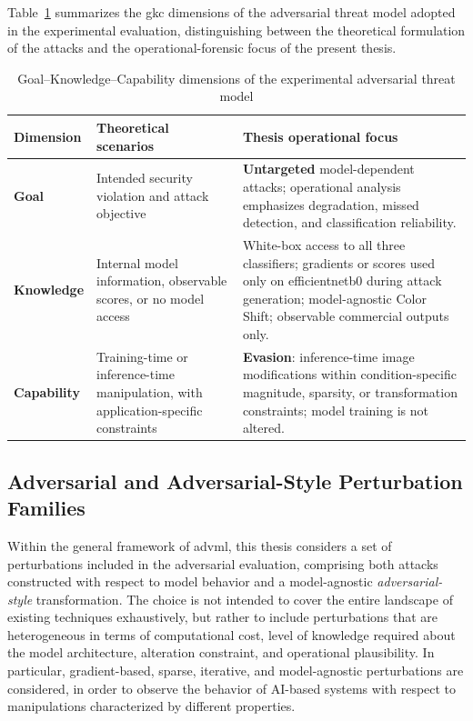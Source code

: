 Table~\ref{tab:threat_model} summarizes the \gls{gkc} dimensions of the adversarial
threat model adopted in the experimental evaluation, distinguishing between the
theoretical formulation of the attacks and the operational-forensic focus of
the present thesis.

\begin{table}[htbp]
    \centering
    \small
    \renewcommand{\arraystretch}{1.25}
    \begin{tabular}{@{}>{\raggedright\arraybackslash}p{}>{\raggedright\arraybackslash}p{}>{\raggedright\arraybackslash}p{}@{}}
        \toprule
        \textbf{Dimension} & \textbf{Theoretical scenarios} & \textbf{Thesis operational focus} \\
        \midrule
        \textbf{Goal} &
        Intended security violation and attack objective &
        \textbf{Untargeted} model-dependent attacks; operational analysis emphasizes degradation, missed detection, and classification reliability. \\
        \textbf{Knowledge} &
        Internal model information, observable scores, or no model access &
        White-box access to all three classifiers; gradients or scores used only on \gls{efficientnetb0} during attack generation; model-agnostic Color Shift; observable commercial outputs only. \\
        \textbf{Capability} &
        Training-time or inference-time manipulation, with application-specific constraints &
        \textbf{Evasion}: inference-time image modifications within condition-specific magnitude, sparsity, or transformation constraints; model training is not altered. \\
        \bottomrule
    \end{tabular}
    \caption{Goal--Knowledge--Capability dimensions of the experimental adversarial threat model}
    \label{tab:threat_model}
\end{table}


\subsection{Adversarial and Adversarial-Style Perturbation Families}
\label{subsec:background_attack_families}

Within the general framework of \gls{advml}, this thesis considers a set of
perturbations included in the adversarial evaluation, comprising both attacks
constructed with respect to model behavior and a model-agnostic
\textit{adversarial-style} transformation. The choice is not intended to cover
the entire landscape of existing techniques exhaustively, but rather to include
perturbations that are heterogeneous in terms of computational cost, level of
knowledge required about the model architecture, alteration constraint, and
operational plausibility. In particular, gradient-based, sparse, iterative, and
model-agnostic perturbations are considered, in order to observe the behavior
of AI-based systems with respect to manipulations characterized by different
properties.

